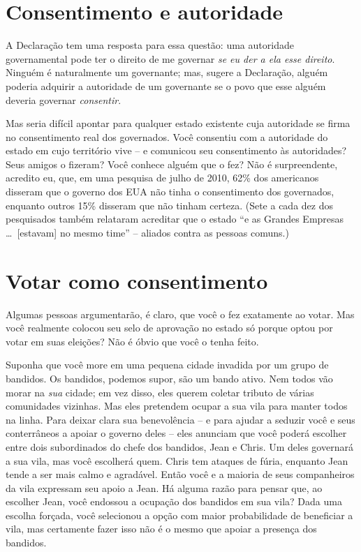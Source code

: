 \section{Consentimento e autoridade}

A Declaração tem uma resposta para essa questão: uma autoridade governamental pode ter o direito de me governar \emph{se eu der a ela esse direito}. Ninguém é naturalmente um governante; mas, sugere a Declaração, alguém poderia adquirir a autoridade de um governante se o povo que esse alguém deveria governar \emph{consentir}.

Mas seria difícil apontar para qualquer estado existente cuja autoridade se firma no consentimento real dos governados. Você consentiu com a autoridade do estado em cujo território vive -- e comunicou seu consentimento às autoridades? Seus amigos o fizeram? Você conhece alguém que o fez? Não é surpreendente, acredito eu, que, em uma pesquisa de julho de 2010, 62\% dos americanos disseram que o governo dos EUA não tinha o consentimento dos governados, enquanto outros 15\% disseram que não tinham certeza. (Sete a cada dez dos pesquisados também relataram acreditar que o estado ``e as Grandes Empresas \ldots\ [estavam] no mesmo time'' -- aliados contra as pessoas comuns.)

\section{Votar como consentimento}

Algumas pessoas argumentarão, é claro, que você o fez exatamente ao votar. Mas você realmente colocou seu selo de aprovação no estado só porque optou por votar em suas eleições? Não é óbvio que você o tenha feito.

Suponha que você more em uma pequena cidade invadida por um grupo de bandidos. Os bandidos, podemos supor, são um bando ativo. Nem todos vão morar na \emph{sua} cidade; em vez disso, eles querem coletar tributo de várias comunidades vizinhas. Mas eles pretendem ocupar a sua vila para manter todos na linha. Para deixar clara sua benevolência -- e para ajudar a seduzir você e seus conterrâneos a apoiar o governo deles -- eles anunciam que você poderá escolher entre dois subordinados do chefe dos bandidos, Jean e Chris. Um deles governará a sua vila, mas você escolherá quem. Chris tem ataques de fúria, enquanto Jean tende a ser mais calmo e agradável. Então você e a maioria de seus companheiros da vila expressam seu apoio a Jean. Há alguma razão para pensar que, ao escolher Jean, você endossou a ocupação dos bandidos em sua vila? Dada uma escolha forçada, você selecionou a opção com maior probabilidade de beneficiar a vila, mas certamente fazer isso não é o mesmo que apoiar a presença dos bandidos.

